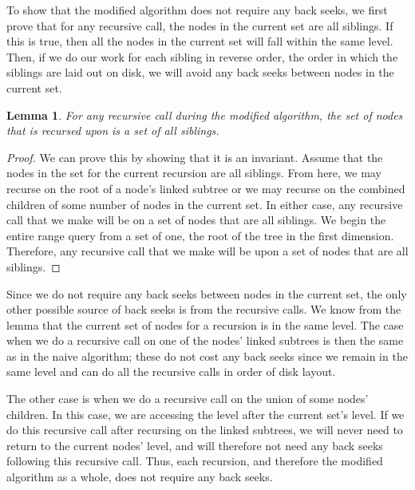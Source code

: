\documentclass[11pt, oneside]{article}
\newtheorem*{lemma}{Lemma}
\begin{document}
To show that the modified algorithm does not require any back seeks, we first
prove that for any recursive call, the nodes in the current set are all
siblings. If this is true, then all the nodes in the current set will fall
within the same level. Then, if we do our work for each sibling in reverse
order, the order in which the siblings are laid out on disk, we will avoid any
back seeks between nodes in the current set.

\begin{lemma}
    For any recursive call during the modified algorithm, the set of nodes that
    is recursed upon is a set of all siblings.
\end{lemma}
\begin{proof}
    We can prove this by showing that it is an invariant. Assume that the nodes
    in the set for the current recursion are all siblings. From here, we may
    recurse on the root of a node's linked subtree or we may recurse on the
    combined children of some number of nodes in the current set. In either
    case, any recursive call that we make will be on a set of nodes that are
    all siblings. We begin the entire range query from a set of one, the root
    of the tree in the first dimension. Therefore, any recursive call that we
    make will be upon a set of nodes that are all siblings. 
\end{proof}

Since we do not require any back seeks between nodes in the current set, the
only other possible source of back seeks is from the recursive calls. We know
from the lemma that the current set of nodes for a recursion is in the same
level. The case when we do a recursive call on one of the nodes' linked
subtrees is then the same as in the naive algorithm; these do not cost any back
seeks since we remain in the same level and can do all the recursive calls in
order of disk layout. 

The other case is when we do a recursive call on the union of some nodes'
children. In this case, we are accessing the level after the current set's
level. If we do this recursive call after recursing on the linked subtrees, we
will never need to return to the current nodes' level, and will therefore not
need any back seeks following this recursive call. Thus, each recursion, and
therefore the modified algorithm as a whole, does not require any back seeks.
\end{document}
